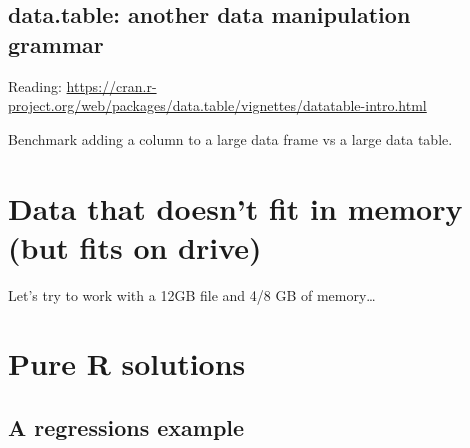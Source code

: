 \documentclass[]{book}
\newenvironment{Shaded}{\begin{snugshade}}{\end{snugshade}}
\newcommand{\KeywordTok}[1]{\textcolor[rgb]{0.13,0.29,0.53}{\textbf{#1}}}
\newcommand{\DecValTok}[1]{\textcolor[rgb]{0.00,0.00,0.81}{#1}}
\newcommand{\StringTok}[1]{\textcolor[rgb]{0.31,0.60,0.02}{#1}}
\newcommand{\OperatorTok}[1]{\textcolor[rgb]{0.81,0.36,0.00}{\textbf{#1}}}
\newcommand{\ErrorTok}[1]{\textcolor[rgb]{0.64,0.00,0.00}{\textbf{#1}}}
\newcommand{\NormalTok}[1]{#1}
\theoremstyle{definition}
\theoremstyle{definition}
\theoremstyle{definition}
\theoremstyle{remark}
\let\BeginKnitrBlock\begin \let\EndKnitrBlock\end
\begin{document}
\begin{Shaded}
\end{Shaded}

\subsection{data.table: another data manipulation
grammar}\label{data.table-another-data-manipulation-grammar}

Reading:
\url{https://cran.r-project.org/web/packages/data.table/vignettes/datatable-intro.html}

\BeginKnitrBlock{exercise}
\protect\hypertarget{exr:unnamed-chunk-118}{}{\label{exr:unnamed-chunk-118}
}Benchmark adding a column to a large data frame vs a large data table.
\EndKnitrBlock{exercise}

\section{Data that doesn't fit in memory (but fits on
drive)}\label{data-that-doesnt-fit-in-memory-but-fits-on-drive}

Let's try to work with a 12GB file and 4/8 GB of memory\ldots{}

\section{Pure R solutions}\label{pure-r-solutions}

\subsection{A regressions example}\label{a-regressions-example}
\end{document}
